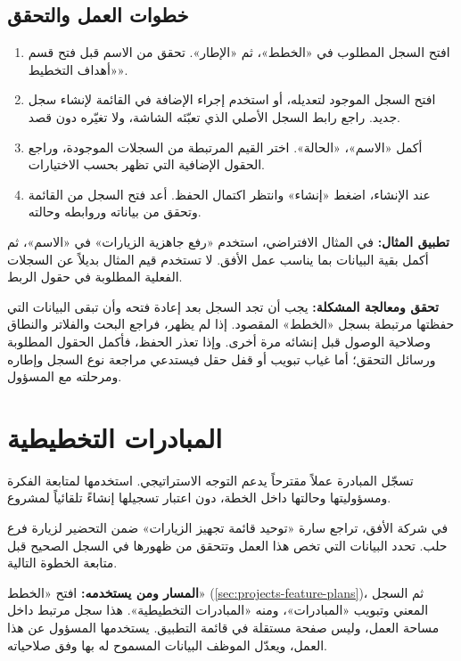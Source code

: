 \subsection{خطوات العمل والتحقق}
\begin{enumerate}
\item افتح السجل المطلوب في «الخطط»، ثم «الإطار». تحقق من الاسم قبل فتح قسم «أهداف التخطيط».
\item افتح السجل الموجود لتعديله، أو استخدم إجراء الإضافة في القائمة لإنشاء سجل جديد. راجع رابط السجل الأصلي الذي تعبّئه الشاشة، ولا تغيّره دون قصد.
\item أكمل «الاسم»، «الحالة». اختر القيم المرتبطة من السجلات الموجودة، وراجع الحقول الإضافية التي تظهر بحسب الاختيارات.
\item عند الإنشاء، اضغط «إنشاء» وانتظر اكتمال الحفظ. أعد فتح السجل من القائمة وتحقق من بياناته وروابطه وحالته.
\end{enumerate}

\textbf{تطبيق المثال:} في المثال الافتراضي، استخدم «رفع جاهزية الزيارات» في «الاسم»، ثم أكمل بقية البيانات بما يناسب عمل الأفق. لا تستخدم قيم المثال بديلاً عن السجلات الفعلية المطلوبة في حقول الربط.

\textbf{تحقق ومعالجة المشكلة:} يجب أن تجد السجل بعد إعادة فتحه وأن تبقى البيانات التي حفظتها مرتبطة بسجل «الخطط» المقصود. إذا لم يظهر، فراجع البحث والفلاتر والنطاق وصلاحية الوصول قبل إنشائه مرة أخرى. وإذا تعذر الحفظ، فأكمل الحقول المطلوبة ورسائل التحقق؛ أما غياب تبويب أو قفل حقل فيستدعي مراجعة نوع السجل وإطاره ومرحلته مع المسؤول.

\clearpage
\section{المبادرات التخطيطية}
\label{sec:projects-feature-planning-initiatives}

تسجّل المبادرة عملاً مقترحاً يدعم التوجه الاستراتيجي. استخدمها لمتابعة الفكرة ومسؤوليتها وحالتها داخل الخطة، دون اعتبار تسجيلها إنشاءً تلقائياً لمشروع.

\begin{rcnote}
في شركة الأفق، تراجع سارة «توحيد قائمة تجهيز الزيارات» ضمن التحضير لزيارة فرع حلب. تحدد البيانات التي تخص هذا العمل وتتحقق من ظهورها في السجل الصحيح قبل متابعة الخطوة التالية.
\end{rcnote}

\textbf{المسار ومن يستخدمه:} افتح «الخطط» (\ref{sec:projects-feature-plans})، ثم السجل المعني وتبويب «المبادرات»، ومنه «المبادرات التخطيطية». هذا سجل مرتبط داخل مساحة العمل، وليس صفحة مستقلة في قائمة التطبيق. يستخدمها المسؤول عن هذا العمل، ويعدّل الموظف البيانات المسموح له بها وفق صلاحياته.

